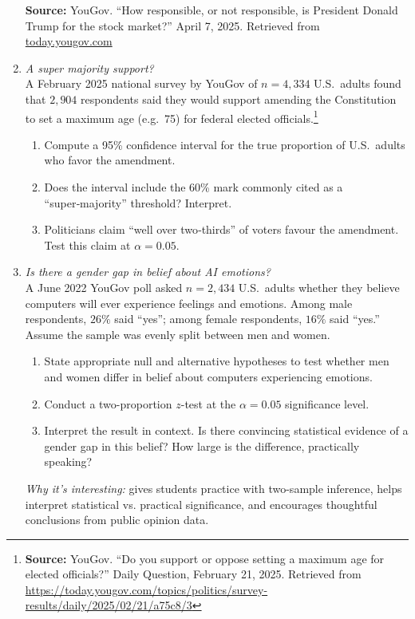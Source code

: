 \documentclass[11pt]{article}
\begin{document}
\begin{enumerate}[label=\textbf{Q\,\arabic*:}, left=0pt]
      \vspace{0.5em}
      \noindent\textbf{Source:} YouGov. “How responsible, or not responsible, is President Donald Trump for the stock market?” April 7, 2025. Retrieved from \href{https://today.yougov.com/topics/politics/survey-results/daily/2025/04/07/6be5c/3}{today.yougov.com}
\item \emph{A super majority support?} \\ A February 2025 national survey by YouGov of $n=4{,}334$ U.S.\ adults found that $2{,}904$ respondents
      said they would support amending the Constitution to set a maximum age (e.g.\ 75) for federal elected officials.\footnote{\textbf{Source:} YouGov. “Do you support or oppose setting a maximum age for elected officials?” Daily Question, February 21, 2025. Retrieved from \url{https://today.yougov.com/topics/politics/survey-results/daily/2025/02/21/a75c8/3}}
      \begin{enumerate}[label=(\alph*)]
         \item Compute a 95\% confidence interval for the true proportion of U.S.\ adults who favor the amendment.
         \item Does the interval include the 60\% mark commonly cited as a “super‑majority” threshold?  Interpret.
         \item Politicians claim “well over two‑thirds” of voters favour the amendment.  Test this claim at $\alpha=0.05$.
      \end{enumerate}

\item \emph{Is there a gender gap in belief about AI emotions?} \\
      A June 2022 YouGov poll asked $n = 2{,}434$ U.S.\ adults whether they believe computers will ever experience feelings and emotions. Among male respondents, $26\%$ said “yes”; among female respondents, $16\%$ said “yes.” Assume the sample was evenly split between men and women.

      \begin{enumerate}[label=(\alph*)]
         \item State appropriate null and alternative hypotheses to test whether men and women differ in belief about computers experiencing emotions.
         \item Conduct a two-proportion $z$-test at the $\alpha = 0.05$ significance level.
         \item Interpret the result in context. Is there convincing statistical evidence of a gender gap in this belief? How large is the difference, practically speaking?
      \end{enumerate}
      \textit{Why it’s interesting:} gives students practice with two-sample inference, helps interpret statistical vs. practical significance, and encourages thoughtful conclusions from public opinion data.


\end{enumerate}
\end{document}
